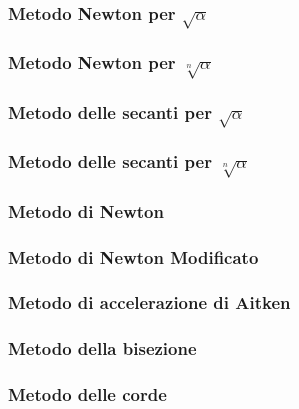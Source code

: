 \label{functcap2}
\subsubsection{Metodo Newton per $\sqrt{\alpha}$}

\subsubsection{Metodo Newton per $\sqrt[n]{\alpha}$}

\subsubsection{Metodo delle secanti per $\sqrt{\alpha}$}

\subsubsection{Metodo delle secanti per $\sqrt[n]{\alpha}$}

\subsubsection{Metodo di Newton}

\subsubsection{Metodo di Newton Modificato}

\subsubsection{Metodo di accelerazione di Aitken}

\subsubsection{Metodo della bisezione}

\subsubsection{Metodo delle corde}
